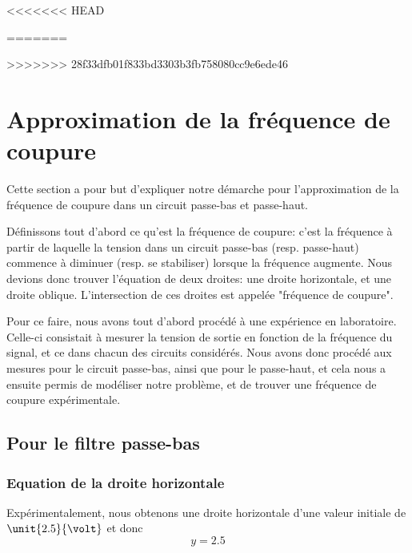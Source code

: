 

 
      
%
 
<<<<<<< HEAD


=======


>>>>>>> 28f33dfb01f833bd3303b3fb758080cc9e6ede46

\section{Approximation de la fréquence de coupure}

Cette section a pour but d'expliquer notre démarche pour l'approximation de la fréquence de coupure dans un circuit passe-bas et passe-haut. 

Définissons tout d'abord ce qu'est la fréquence de coupure: c'est la fréquence à partir de laquelle la tension dans un circuit passe-bas (resp. passe-haut) commence à diminuer (resp. se stabiliser) lorsque la fréquence augmente.
Nous devions donc trouver l'équation de deux droites: une droite horizontale, et une droite oblique. L'intersection de ces droites est appelée "fréquence de coupure".

Pour ce faire, nous avons tout d'abord procédé à une expérience en laboratoire. 
Celle-ci consistait à mesurer la tension de sortie en fonction de la fréquence du signal, et ce dans chacun des circuits considérés. 
Nous avons donc procédé aux mesures pour le circuit passe-bas, ainsi que pour le passe-haut, et cela nous a ensuite permis de modéliser notre problème, et de trouver une fréquence de coupure expérimentale.

\subsection{Pour le filtre passe-bas}

%   

\subsubsection{Equation de la droite horizontale} %
Expérimentalement, nous obtenons une droite horizontale d'une valeur initiale de $\unit{2.5}{\volt}$ et donc \[y=2.5\]

